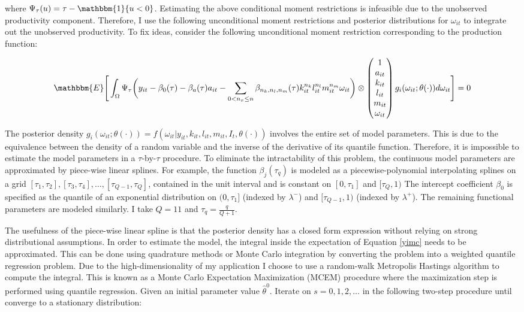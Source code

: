 \documentclass{article}
\begin{document}
where $\Psi_{\tau}(u)=\tau-\mathbbm{1}\{u<0\}$. Estimating the above conditional moment restrictions is infeasible due to the unobserved productivity component. Therefore, I use the following unconditional moment restrictions and posterior distributions for $\omega_{it}$ to integrate out the unobserved productivity. To fix ideas, consider the following unconditional moment restriction corresponding to the production function:

\begin{equation}\label{yimc}
\mathbbm{E}\Bigg[\int_{\Omega}\Psi_{\tau}\bigg(y_{it}-\beta_{0}(\tau)-\beta_{a}(\tau)a_{it}-\sum_{0<n_{x}\leq n}\beta_{n_{k}, n_{l}, n_{m}}(\tau)k_{it}^{n_{k}}l^{n_{l}}_{it}m^{n_{m}}_{it}\omega_{it}\bigg)\otimes
\begin{pmatrix}
1 \\
a_{it} \\
k_{it} \\
l_{it}\\
m_{it} \\
\omega_{it} 
\end{pmatrix}
g_{i}(\omega_{it};\theta(\cdot))d\omega_{it}\Bigg]=0
\end{equation}

The posterior density $g_{i}(\omega_{it};\theta(\cdot))=f(\omega_{it}|y_{it}, k_{it}, l_{it}, m_{it}, I_{t}, \theta(\cdot))$ involves the entire set of model parameters. This is due to the equivalence between the density of a random variable and the inverse of the derivative of its quantile function. Therefore, it is impossible to estimate the model parameters in a $\tau$-by-$\tau$ procedure. To eliminate the intractability of this problem, the continuous model parameters are approximated by piece-wise linear splines. For example, the function $\beta_{j}(\tau_{q})$ is modeled as a piecewise-polynomial interpolating splines on a grid $[\tau_{1},\tau_{2}], [\tau_{3},\tau_{4}],\dots, [\tau_{Q-1},\tau_{Q}]$, contained in the unit interval and is constant on $[0, \tau_{1}]$ and $[\tau_{Q}, 1)$ The intercept coefficient $\beta_{0}$ is specified as the quantile of an exponential distribution on $(0,\tau_{1}]$ (indexed by $\lambda^{-}$) and $[\tau_{Q-1}, 1)$ (indexed by $\lambda^{+}$). The remaining functional parameters are modeled similarly. I take $Q=11$ and $\tau_{q}=\frac{q}{Q+1}$. 

The usefulness of the piece-wise linear spline is that the posterior density has a closed form expression without relying on strong distributional assumptions. In order to estimate the model, the integral inside the expectation of Equation \eqref{yimc} needs to be approximated. This can be done using quadrature methods or Monte Carlo integration by converting the problem into a weighted quantile regression problem. Due to the high-dimensionality of my application I choose to use a random-walk Metropolis Hastings algorithm to compute the integral. This is known as a Monte Carlo Expectation Maximization (MCEM) procedure where the maximization step is performed using quantile regression. Given an initial parameter value $\hat{\theta}^{0}$. Iterate on $s=0,1,2,\dots$ in the following two-step procedure until converge to a stationary distribution:
\end{document}
